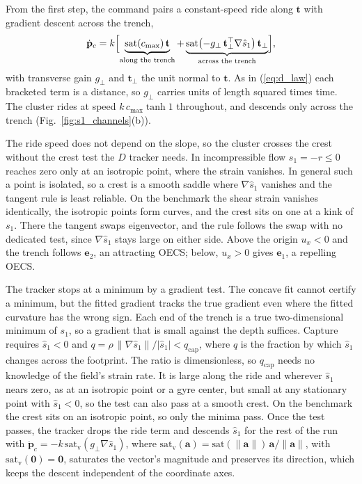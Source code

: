 \documentclass[lettersize,journal]{IEEEtran}
\begin{document}
From the first step, the command pairs a constant-speed ride along
$\mathbf{t}$ with gradient descent across the trench,
\begin{equation}
    \dot{\mathbf{p}}_c = k\Bigl[
    \underbrace{\mathrm{sat}(c_{\max})\,\mathbf{t}}_{\text{along the trench}}
    + \underbrace{\mathrm{sat}\bigl(-g_\perp\,\mathbf{t}_\perp^\top
      \nabla\hat{s}_1\bigr)\,\mathbf{t}_\perp}_{\text{across the trench}}\Bigr],
    \label{eq:s1_law}
\end{equation}
with transverse gain $g_\perp$ and $\mathbf{t}_\perp$ the unit normal to
$\mathbf{t}$. As in (\ref{eq:d_law}) each bracketed term is a distance, so
$g_\perp$ carries units of length squared times time. The cluster rides at
speed $k\,c_{\max}\tanh 1$ throughout, and descends only across the
trench (Fig.~\ref{fig:s1_channels}(b)).

The ride speed does not depend on the slope, so the cluster crosses the
crest without the crest test the $D$ tracker needs. In incompressible flow
$s_1 = -r \leq 0$ reaches zero only at an isotropic point, where the
strain vanishes. In general such a point is isolated, so a crest is a
smooth saddle where $\nabla\hat{s}_1$ vanishes and the tangent rule is
least reliable. On the benchmark the shear strain vanishes identically, the
isotropic points form curves, and the crest sits on one at a kink of
$s_1$. There the tangent swaps eigenvector, and the rule follows the swap
with no dedicated test, since $\nabla\hat{s}_1$ stays large on either
side. Above the origin $u_x < 0$ and the trench follows $\mathbf{e}_2$,
an attracting OECS; below, $u_x > 0$ gives $\mathbf{e}_1$, a repelling
OECS.

The tracker stops at a minimum by a gradient test. The concave fit cannot
certify a minimum, but the fitted gradient tracks the true gradient even
where the fitted curvature has the wrong sign. Each end of the trench is
a true two-dimensional minimum of $s_1$, so a gradient that is small
against the depth suffices. Capture requires $\hat{s}_1 < 0$ and
$q = \rho\,\|\nabla\hat{s}_1\|/|\hat{s}_1| < q_{\mathrm{cap}}$, where $q$ is the fraction by which $\hat{s}_1$ changes across the
footprint. The ratio is dimensionless, so $q_{\mathrm{cap}}$ needs no
knowledge of the field's strain rate. It is large along the ride and wherever $\hat{s}_1$ nears zero, as at an isotropic point or a
gyre center, but small at any stationary point with $\hat{s}_1 < 0$, so
the test can also pass at a smooth crest. On the benchmark the crest sits
on an isotropic point, so only the minima pass. Once the test passes, the
tracker
drops the ride term and descends $\hat{s}_1$ for the rest of the run with
$\dot{\mathbf{p}}_c = -k\,\mathrm{sat}_{\mathrm{v}}(g_\perp\nabla\hat{s}_1)$,
where $\mathrm{sat}_{\mathrm{v}}(\mathbf{a}) =
\mathrm{sat}(\|\mathbf{a}\|)\,\mathbf{a}/\|\mathbf{a}\|$, with
$\mathrm{sat}_{\mathrm{v}}(\mathbf{0}) = \mathbf{0}$, saturates the
vector's magnitude and preserves its direction, which keeps the descent
independent of the coordinate axes.
\end{document}
